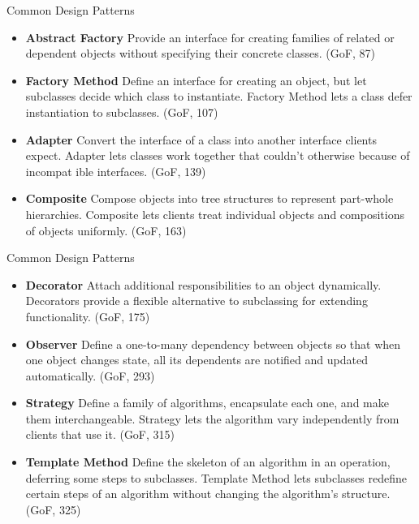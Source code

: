 \documentclass{beamer}
\begin{document}
\begin{frame}[fragile]{Common Design Patterns}

\begin{itemize}
\item {\bf Abstract Factory} Provide an interface for creating families of related or dependent objects without specifying their concrete classes. (GoF, 87)
\item {\bf Factory Method} Define an interface for creating an object, but let subclasses decide which class to instantiate. Factory Method lets a class defer instantiation to subclasses. (GoF, 107)
\item {\bf Adapter} Convert the interface of a class into another interface clients expect. Adapter lets classes work together that couldn't otherwise because of incompat ible interfaces. (GoF, 139)
\item {\bf Composite} Compose objects into tree structures to represent part-whole hierarchies. Composite lets clients treat individual objects and compositions of objects uniformly. (GoF, 163)
\end{itemize}


\end{frame}

\begin{frame}[fragile]{Common Design Patterns}

\begin{itemize}
\item {\bf Decorator} Attach additional responsibilities to an object dynamically. Decorators provide a flexible alternative to subclassing for extending functionality. (GoF, 175)
\item {\bf Observer} Define a one-to-many dependency between objects so that when one object changes state, all its dependents are notified and updated automatically. (GoF, 293)
\item {\bf Strategy} Define a family of algorithms, encapsulate each one, and make them interchangeable. Strategy lets the algorithm vary independently from clients that use it. (GoF, 315)
\item {\bf Template Method} Define the skeleton of an algorithm in an operation, deferring some steps to subclasses. Template Method lets subclasses redefine certain steps of an algorithm without changing the algorithm's structure. (GoF, 325)
\end{itemize}


\end{frame}








\end{document}
